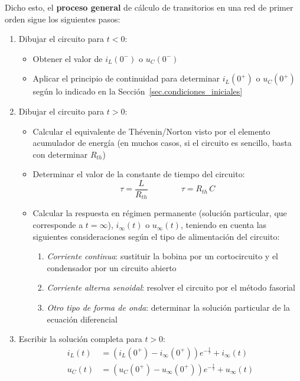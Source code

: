 	Dicho esto, el \textbf{proceso general} de cálculo de transitorios en una red de primer orden sigue los siguientes pasos:
	\begin{enumerate}
	\item Dibujar el circuito para $t < 0$:
        \begin{itemize}
        \item Obtener el valor de $i_L(0^-)$ o $u_C(0^-)$
        \item Aplicar el principio de continuidad para determinar $i_L(0^+)$ o $u_C(0^+)$ según lo indicado en la Sección~\ref{sec.condiciones_iniciales}
        \end{itemize}
    \item Dibujar el circuito para \(t > 0\):
        \begin{itemize}
        \item Calcular el equivalente de Thévenin/Norton visto por el elemento acumulador de energía (en muchos casos, si el circuito es sencillo, basta con determinar $R_{th}$)
        \item Determinar el valor de la constante de tiempo del circuito:
        \begin{equation*}
            \tau = \dfrac{L}{R_{th}} \qquad\qquad \tau = R_{th}\,{C}
        \end{equation*}
        \item Calcular la respuesta en régimen permanente (solución particular, que corresponde a $t=\infty$), $i_\infty(t)$ o $u_\infty(t)$, teniendo en cuenta las siguientes consideraciones según el tipo de alimentación del circuito:
        \begin{enumerate}
	        \item \textit{Corriente continua}: sustituir la bobina por un cortocircuito y el condensador por un circuito abierto
	        \item \textit{Corriente alterna senoidal}: resolver el circuito por el método fasorial
	        \item \textit{Otro tipo de forma de onda}: determinar la solución particular de la ecuación diferencial
	    \end{enumerate}
        \end{itemize}
    \item Escribir la solución completa para $t>0$:
    \begin{align*}
    i_L(t) &= \left(i_L(0^+) - i_\infty(0^+)\right) e^{-\frac{t}{\tau}} + i_\infty(t)\\
    u_C(t) &= \left(u_C(0^+) - u_\infty(0^+)\right) e^{-\frac{t}{\tau}} + u_\infty(t)\\
    \end{align*}
	\end{enumerate}
	
